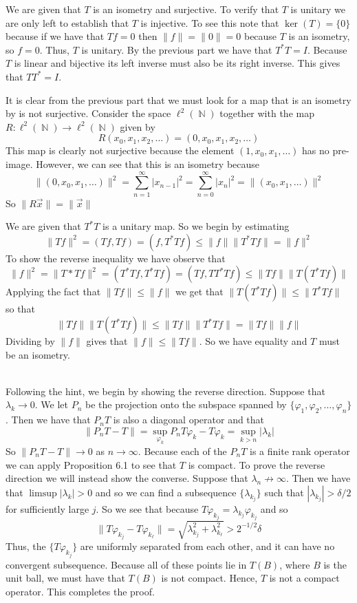 \documentclass{article}
\DeclareMathOperator{\N}{\mathbb{N}}
\newcommand{\problem}[1]{\noindent{\textbf{Problem #1}}\\}
\newcommand{\problempart}[1]{\noindent{\textbf{(#1)}}}
\newcommand{\norm}[1]{\|#1\|}
\begin{document}
\problempart{b} We are given that $T$ is an isometry and surjective. To verify that $T$ is unitary we are only left to establish that $T$ is injective. To see this note that $\ker(T) = \{0\}$ because if we have that $Tf = 0$ then $\norm{f} = \norm{0} = 0$ because $T$ is an isometry, so $f = 0$. Thus, $T$ is unitary. By the previous part we have that $T^*T = I$. Because $T$ is linear and bijective its left inverse must also be its right inverse. This gives that $TT^* = I$.  

\problempart{c} It is clear from the previous part that we must look for a map that is an isometry by is not surjective. Consider the space $\ell^2(\N)$ together with the map $R: \ell^2(\N) \to \ell^2(\N)$ given by
\[
R(x_0,x_1,x_2,\ldots) = (0, x_0, x_1,x_2, \ldots)
\]
This map is clearly not surjective because the element $(1,x_0,x_1,\ldots)$ has no pre-image. However, we can see that this is an isometry because
\[
\norm{(0,x_0,x_1, \ldots)}^2 = \sum_{n=1}^\infty |x_{n-1}|^2 = \sum_{n=0}^\infty |x_{n}|^2 = \norm{(x_0, x_1, \ldots)}^2
\]
So $\norm{R\vec{x}} = \norm{\vec{x}}$

\problempart{d} We are given that $T^*T$ is a unitary map. So we begin by estimating
\[
\norm{Tf}^2 = (Tf,Tf) = (f,T^*Tf) \leq \norm{f}\norm{T^*Tf} = \norm{f}^2 
\]
To show the reverse inequality we have observe that
\[
\norm{f}^2 = \norm{T*Tf}^2 = (T^*Tf, T^*Tf) = (Tf, TT^*Tf) \leq \norm{Tf}\norm{T(T^*Tf)}
\]
Applying the fact that $\norm{Tf} \leq \norm{f}$ we get that $\norm{T(T^*Tf)} \leq \norm{T^*Tf}$ so that
\[
\norm{Tf}\norm{T(T^*Tf)} \leq \norm{Tf}\norm{T^*Tf} = \norm{Tf}\norm{f}
\] 
Dividing by $\norm{f}$ gives that $\norm{f} \leq \norm{Tf}$. So we have equality and $T$ must be an isometry. 

\problem{4.7.25} Following the hint, we begin by showing the reverse direction. Suppose that $\lambda_k \to 0$. We let $P_n$ be the projection onto the subspace spanned by $\{\varphi_1, \varphi_2, \ldots, \varphi_n\}$. Then we have that $P_nT$ is also a diagonal operator and that 
\[
\norm{P_nT - T} = \sup_{\varphi_k} P_nT\varphi_k - T\varphi_k = \sup_{k > n} |\lambda_k|  
\]
So $\norm{P_nT - T} \to 0$ as $n \to \infty$. Because each of the $P_nT$ is a finite rank operator we can apply Proposition 6.1 to see that $T$ is compact. To prove the reverse direction we will instead show the converse. Suppose that $\lambda_n \not\to\infty$. Then we have that $\limsup |\lambda_k| > 0$ and so we can find a subsequence $\{\lambda_{k_j}\}$ such that $|\lambda_{k_j}| > \delta/2$ for sufficiently large $j$. So we see that because $T\varphi_{k_j} = \lambda_{k_j}\varphi_{k_j}$ and so 
\[
\norm{T\varphi_{k_j} - T\varphi_{k_\ell}} = \sqrt{\lambda_{k_j}^2 + \lambda_{k_\ell}^2} > 2^{-1/2}\delta
\]
Thus, the $\{T\varphi_{k_j}\}$ are uniformly separated from each other, and it can have no convergent subsequence. Because all of these points lie in $T(B)$, where $B$ is the unit ball, we must have that $T(B)$ is not compact. Hence, $T$ is not a compact operator. This completes the proof. 
\end{document}
